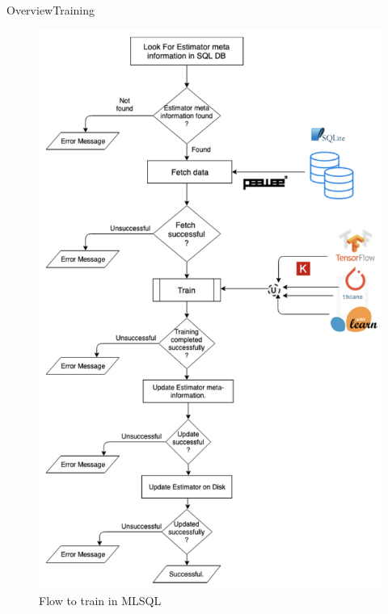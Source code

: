 \documentclass[handout, xcolor={dvipsnames}]{beamer}
\begin{document}
\begin{frame}{Overview}{Training}
  \begin{figure}
      \centering
      \includegraphics[scale = 0.35]{SQL_train.png}
      \caption{Flow to train in MLSQL}
      \label{fig:flow_train}
  \end{figure}
\end{frame}
\end{document}
